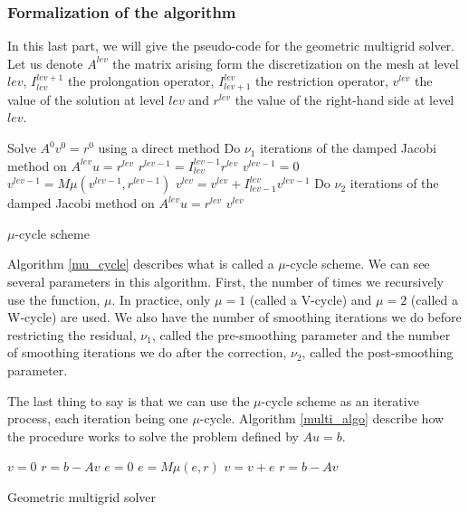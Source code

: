 \subsubsection{Formalization of the algorithm}

In this last part, we will give the pseudo-code for the geometric multigrid solver. Let us denote $A^{lev}$ the matrix arising form the discretization on the mesh at level $lev$, $I_{lev}^{lev+1}$ the prolongation operator, $I_{lev+1}^{lev}$ the restriction operator, $v^{lev}$ the value of the solution at level $lev$ and $r^{lev}$ the value of the right-hand side at level $lev$.

\begin{algorithm}
\begin{algorithmic}
	\State Solve $A^0v^0 = r^0$ using a direct method
\Else
	\State Do $\nu_1$ iterations of the damped Jacobi method on $A^{lev}u = r^{lev}$
	\State $r^{lev-1} = I_{lev}^{lev-1}r^{lev}$
	\State $v^{lev-1} = 0$
	\State $v^{lev-1} = M\mu(v^{lev-1},r^{lev-1})$ 
	\State $v^{lev} = v^{lev} + I_{lev-1}^{lev}v^{lev-1}$
	\State Do $\nu_2$ iterations of the damped Jacobi method on $A^{lev}u = r^{lev}$
\EndIf	
\Return $v^{lev}$
\EndFunction
\end{algorithmic}
\caption{$\mu$-cycle scheme}
\label{mu_cycle}
\end{algorithm}


Algorithm \ref{mu_cycle} describes what is called a $\mu$-cycle scheme. We can see several parameters in this algorithm. First, the number of times we recursively use the function, $\mu$. In practice, only $\mu=1$ (called a V-cycle) and $\mu=2$ (called a W-cycle) are used. We also have the number of smoothing iterations we do before restricting the residual, $\nu_1$, called the pre-smoothing parameter and the number of smoothing iterations we do after the correction, $\nu_2$, called the post-smoothing parameter. 

The last thing to say is that we can use the $\mu$-cycle scheme as an iterative process, each iteration being one $\mu$-cycle. Algorithm \ref{multi_algo} describe how the procedure works to solve the problem defined by $Au=b$.

\begin{algorithm}
\begin{algorithmic}
\State $v = 0$
\State $r = b-Av$
\State $e = 0$
\State $e = M\mu(e,r)$
\State $v = v + e$
\State $r = b-Av$
\EndFor
\end{algorithmic}
\caption{Geometric multigrid solver}
\label{multi_algo}
\end{algorithm}

